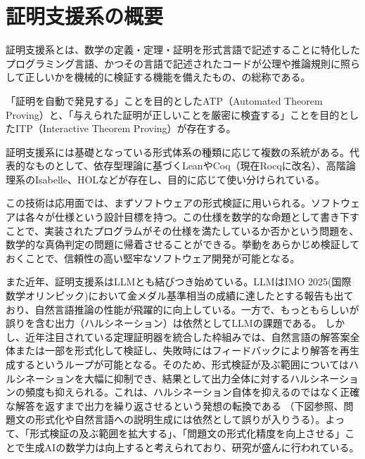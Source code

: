 \documentclass[a4paper,12pt]{bxjsbook}
\newlength{\customindent}
\newenvironment{body}{
  \par
  \begingroup
  \setlength{\leftskip}{\customindent}
  \setlength{\rightskip}{0pt}
  \setlength{\parindent}{1em}
  \setlength{\displayindent}{\customindent}
  \setlength{\displaywidth}{\dimexpr\linewidth-\customindent\relax}
}{
  \par
  \endgroup
}
\theoremstyle{theorem}
\begin{document}
    \section{証明支援系の概要}
    \begin{body}
        \indent 証明支援系とは、数学の定義・定理・証明を形式言語で記述することに特化したプログラミング言語、かつその言語で記述されたコードが公理や推論規則に照らして正しいかを機械的に検証する機能を備えたもの、の総称である。
        
        \indent 「証明を自動で発見する」ことを目的としたATP（Automated Theorem Proving）と、「与えられた証明が正しいことを厳密に検査する」ことを目的としたITP（Interactive Theorem Proving）が存在する。

        \indent 証明支援系には基礎となっている形式体系の種類に応じて複数の系統がある。代表的なものとして、依存型理論に基づくLeanやCoq（現在Rocqに改名）、高階論理系のIsabelle、HOLなどが存在し、目的に応じて使い分けられている。

        \indent この技術は応用面では、まずソフトウェアの形式検証に用いられる。ソフトウェアは各々が仕様という設計目標を持つ。この仕様を数学的な命題として書き下すことで、実装されたプログラムがその仕様を満たしているか否かという問題を、数学的な真偽判定の問題に帰着させることができる。挙動をあらかじめ検証しておくことで、信頼性の高い堅牢なソフトウェア開発が可能となる。

        \indent また近年、証明支援系はLLMとも結びつき始めている。LLMはIMO 2025(国際数学オリンピック)において金メダル基準相当の成績に達したとする報告も出ており\cite{DeepMindIMO2025}、自然言語推論の性能が飛躍的に向上している。一方で、もっともらしいが誤りを含む出力（ハルシネーション）は依然としてLLMの課題である。
        しかし、近年注目されている定理証明器を統合した枠組みでは、自然言語の解答案全体または一部を形式化して検証し、失敗時にはフィードバックにより解答を再生成するというループが可能となる。そのため、形式検証が及ぶ範囲についてはハルシネーションを大幅に抑制でき、結果として出力全体に対するハルシネーションの頻度も抑えられる。これは、ハルシネーション自体を抑えるのではなく正確な解答を返すまで出力を繰り返させるという発想の転換である
        （下図参照、問題文の形式化や自然言語への説明生成には依然として誤りが入りうる）。よって、「形式検証の及ぶ範囲を拡大する」、「問題文の形式化精度を向上させる」ことで生成AIの数学力は向上すると考えられており、研究が盛んに行われている。

    \end{body}
\end{document}

